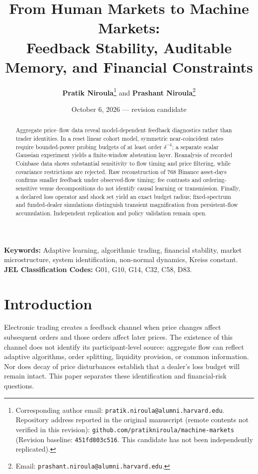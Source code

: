 \documentclass[12pt]{article}
\title{\textbf{From Human Markets to Machine Markets:}\\[0.3em]
\Large Feedback Stability, Auditable Memory, and Financial Constraints}
\author{\textbf{Pratik Niroula}\thanks{Corresponding author email: \texttt{pratik.niroula@alumni.harvard.edu}. Repository address reported in the original manuscript (remote contents not verified in this revision): \texttt{github.com/pratikniroula/machine-markets} (Revision baseline: \texttt{451fd803c516}. This candidate has not been independently replicated).} \quad and \quad \textbf{Prashant Niroula}\thanks{Email: \texttt{prashant.niroula@alumni.harvard.edu}.}}
\date{October 6, 2026 --- revision candidate}
\theoremstyle{definition}
\theoremstyle{remark}
\begin{document}
\hypersetup{pageanchor=false}\maketitle
\thispagestyle{empty}

\vspace{-0.5em}
\begin{abstract}
\noindent Aggregate price--flow data reveal model-dependent feedback diagnostics rather than trader identities. In a reset linear cohort model, symmetric near-coincident rates require bounded-power probing budgets of at least order $\delta^{-4}$; a separate scalar Gaussian experiment yields a finite-window abstention layer. Reanalysis of recorded Coinbase data shows substantial sensitivity to flow timing and price filtering, while covariance restrictions are rejected. Raw reconstruction of 768 Binance asset-days confirms smaller feedback under observed-flow timing; fee contrasts and ordering-sensitive venue decompositions do not identify causal learning or transmission. Finally, a declared loss operator and shock set yield an exact budget radius; fixed-spectrum and funded-dealer simulations distinguish transient magnification from persistent-flow accumulation. Independent replication and policy validation remain open.
\end{abstract}

\vspace{1.0em}
\noindent\textbf{Keywords:} Adaptive learning, algorithmic trading, financial stability, market microstructure, system identification, non-normal dynamics, Kreiss constant.\\
\textbf{JEL Classification Codes:} G01, G10, G14, C32, C58, D83.

\newpage
\hypersetup{pageanchor=true}\setcounter{page}{1}


\section{Introduction}
\label{sec:intro}
Electronic trading creates a feedback channel when price changes affect subsequent orders and those orders affect later prices. The existence of this channel does not identify its participant-level source: aggregate flow can reflect adaptive algorithms, order splitting, liquidity provision, or common information. Nor does decay of price disturbances establish that a dealer's loss budget will remain intact. This paper separates these identification and financial-risk questions.
\end{document}
